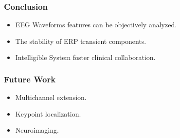 \documentclass[aspectratio=169]{beamer}
\newcommand\Fontre{\fontsize{16}{16.2}\selectfont}
\begin{document}
\begin{frame}
\frametitle{Conclusion}
\begin{center}
\begin{itemize}
\item \Fontre EEG Waveforms features can be objectively analyzed.
\item \Fontre The stability of ERP transient components.
\item \Fontre Intelligible System foster clinical collaboration.
\end{itemize}
\end{center}
\end{frame}    
    
%

    \begin{frame}
        \frametitle{Future Work}
        \begin{center}
            \begin{itemize}
                \item \Fontre Multichannel extension.
                \item \Fontre Keypoint localization.
                \item \Fontre Neuroimaging.
            \end{itemize}
        \end{center}
    \end{frame}       
   
\end{document}
